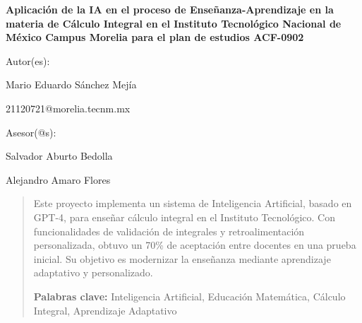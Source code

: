 \begin{center}
	\vspace*{2cm}
	
	\Large\textbf{Aplicación de la IA en el proceso de Enseñanza-Aprendizaje en la 
		materia de Cálculo Integral en el Instituto Tecnológico Nacional de México Campus Morelia para el plan de estudios ACF-0902}
	
	\vspace{1.5cm}
	
	Autor(es):
	
	\vspace{0.5cm}
	
	Mario Eduardo Sánchez Mejía
	
	\vspace{0.3cm}
	
	\small{21120721@morelia.tecnm.mx}
	
	\vspace{1.5cm}
	
	Asesor(@s):
	
	\vspace{0.5cm}
	
	Salvador Aburto Bedolla
	
	Alejandro Amaro Flores
	
	\vspace{0.5cm}
	
	\begin{abstract}
		\noindent
		\justifying
		Este proyecto implementa un sistema de Inteligencia Artificial, basado en GPT-4, para enseñar cálculo integral en el Instituto Tecnológico. Con funcionalidades de validación de integrales y retroalimentación personalizada, obtuvo un 70\% de aceptación entre docentes en una prueba inicial. Su objetivo es modernizar la enseñanza mediante aprendizaje adaptativo y personalizado.
		
		\vspace{0.5cm}
		\noindent
		\textbf{Palabras clave:} Inteligencia Artificial, Educación Matemática, Cálculo Integral, Aprendizaje Adaptativo
	\end{abstract}
\end{center}

\clearpage
{}